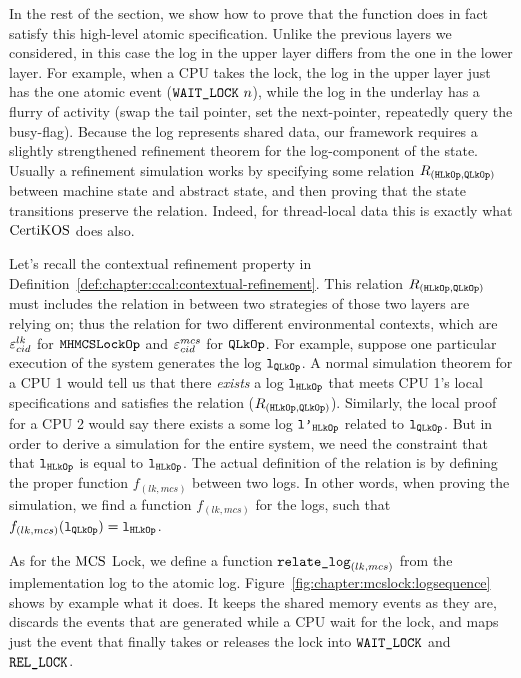 In the rest of the section, we show how to prove that the function
does in fact satisfy this high-level atomic specification.
Unlike the previous layers we considered, in this case the log in the
upper layer differs from the one in the lower layer. For example, when
a CPU takes the lock, the log in the upper layer just has the one
atomic event (${\mathrm{\texttt{WAIT\_LOCK}}}~{n}$), while the log in the underlay
has a flurry of activity (swap the tail pointer, set the next-pointer,
repeatedly query the busy-flag).
Because the log represents shared data, our framework requires a
slightly strengthened refinement theorem for the log-component of the
state. Usually a refinement simulation works by specifying some
relation $R_{({\mathrm{\texttt{HLkOp}}}, {\mathrm{\texttt{QLkOp}}})}$ between machine state and abstract state, and then
proving that the state transitions preserve the relation. Indeed, for
thread-local data this is exactly what $\mathrm{CertiKOS}$ does also.

Let's recall the contextual refinement property in Definition~\ref{def:chapter:ccal:contextual-refinement}. 
This relation   $R_{({\mathrm{\texttt{HLkOp}}}, {\mathrm{\texttt{QLkOp}}})}$ must includes the relation in between 
two strategies of those two layers are relying on; 
thus the relation for two different environmental contexts, which are ${\varepsilon}^{lk}_{cid}$ for ${\mathrm{\texttt{MHMCSLockOp}}}$ and ${\varepsilon}^{mcs}_{cid}$ for ${\mathrm{\texttt{QLkOp}}}$.
For example, suppose one particular
execution of the system generates the log ${\mathrm{\texttt{l}}}_{{\mathrm{\texttt{QLkOp}}}}$.  A normal simulation
theorem for a CPU 1 would tell us that there \emph{exists} a log ${\mathrm{\texttt{l}}}_{{\mathrm{\texttt{HLkOp}}}}$
that meets CPU 1's local specifications and satisfies the relation
($R_{({{\mathrm{\texttt{HLkOp}}}}, {{\mathrm{\texttt{QLkOp}}}})}$). 
Similarly, the local proof for a CPU 2 would say there
exists a some log ${\mathrm{\texttt{l'}}}_{{\mathrm{\texttt{HLkOp}}}}$
related to  ${\mathrm{\texttt{l}}}_{{\mathrm{\texttt{QLkOp}}}}$. 
But in order to derive a simulation for the
entire system, we need the constraint that that ${\mathrm{\texttt{l}}}_{{\mathrm{\texttt{HLkOp}}}}$  is equal to
${\mathrm{\texttt{l}}}_{{\mathrm{\texttt{HLkOp}}}}$. 
The actual definition of the relation is by defining the proper function $f_{(lk, mcs)}$ between two logs.
In other words, when proving the simulation,
we find a function $f_{(lk, mcs)}$ for the logs, such that $f_{(lk, mcs)}({\mathrm{\texttt{l}}}_{{\mathrm{\texttt{QLkOp}}}}) = {\mathrm{\texttt{l}}}_{{\mathrm{\texttt{HLkOp}}}}$.


As for the $\mathrm{MCS}$ Lock, we define a function ${\mathrm{\texttt{relate\_log}}}_{(lk, mcs)}$ from the
implementation log to the atomic log. Figure~\ref{fig:chapter:mcslock:logsequence}
shows by example what it does. It keeps the shared memory events as
they are, discards the events that are generated while a CPU wait for
the lock, and maps just the event that finally takes or releases the
lock into ${\mathrm{\texttt{WAIT\_LOCK}}}$ and ${\mathrm{\texttt{REL\_LOCK}}}$.

